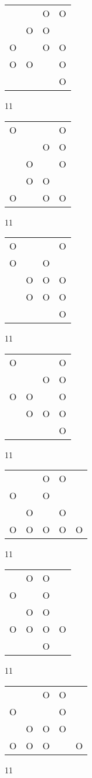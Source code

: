 \begin{tabular}{|m{0.2cm}m{0.2cm}m{0.2cm}m{0.2cm}|}\hline
 & &O&O\\
 &O&O& \\
O& &O&O\\
O&O& &O\\
 & & &O\\
\hline\end{tabular}11
\begin{tabular}{|m{0.2cm}m{0.2cm}m{0.2cm}m{0.2cm}|}\hline
O& & &O\\
 & &O&O\\
 &O& &O\\
 &O&O& \\
O& &O&O\\
\hline\end{tabular}11
\begin{tabular}{|m{0.2cm}m{0.2cm}m{0.2cm}m{0.2cm}|}\hline
O& & &O\\
O& &O& \\
 &O&O&O\\
 &O&O&O\\
 & & &O\\
\hline\end{tabular}11
\begin{tabular}{|m{0.2cm}m{0.2cm}m{0.2cm}m{0.2cm}|}\hline
O& & &O\\
 & &O&O\\
O&O& &O\\
 &O&O&O\\
 & & &O\\
\hline\end{tabular}11
\begin{tabular}{|m{0.2cm}m{0.2cm}m{0.2cm}m{0.2cm}m{0.2cm}|}\hline
 & &O&O& \\
O& &O& & \\
 &O& &O& \\
O&O&O&O&O\\
\hline\end{tabular}11
\begin{tabular}{|m{0.2cm}m{0.2cm}m{0.2cm}m{0.2cm}|}\hline
 &O&O& \\
O& &O& \\
 &O&O& \\
O&O&O&O\\
 & &O& \\
\hline\end{tabular}11
\begin{tabular}{|m{0.2cm}m{0.2cm}m{0.2cm}m{0.2cm}m{0.2cm}|}\hline
 & &O&O& \\
O& & &O& \\
 &O&O&O& \\
O&O&O& &O\\
\hline\end{tabular}11
